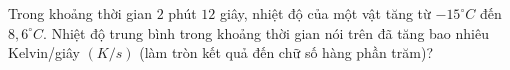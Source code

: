 

\begin{ex}
Trong khoảng thời gian $2$ phút $12$ giây, nhiệt độ của một vật tăng từ $-15^\circ C$ đến $8,6^\circ C$. Nhiệt độ trung bình trong khoảng thời gian nói trên đã tăng bao nhiêu Kelvin/giây $(K/s)$ (làm tròn kết quả đến chữ số hàng phần trăm)?
\end{ex}
